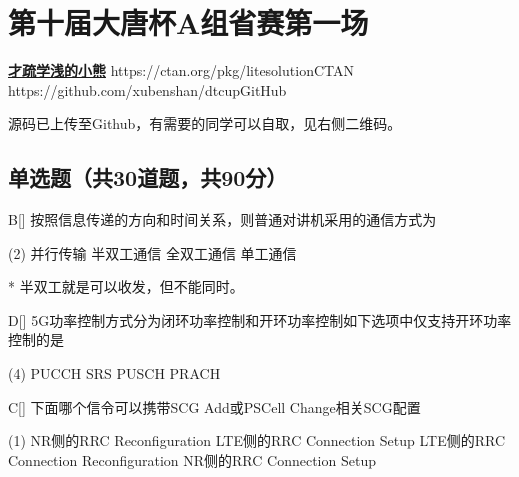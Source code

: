 \chapter{第十届大唐杯A组省赛第一场}
\fancyhead[R]{\color{H6}\kaishu\rightmark\,}

\date{2023年4月08日}{}{\href{https://qm.qq.com/q/UPbGudx8cK}{\textbf{才疏学浅的小熊}}}
{}
{https://ctan.org/pkg/litesolution}{CTAN}
{https://github.com/xubenshan/dtcup}{GitHub}


源码已上传至Github，有需要的同学可以自取，见右侧二维码。

\section{单选题（共30道题，共90分）}



\begin{choice}{B}[]
    按照信息传递的方向和时间关系，则普通对讲机采用的通信方式为
    \begin{tasks}(2)
        \task 并行传输
        \task 半双工通信
        \task 全双工通信
        \task 单工通信
    \end{tasks}
\end{choice}

\begin{solution}*
    半双工就是可以收发，但不能同时。

\end{solution}


\begin{choice}{D}[]
    5G功率控制方式分为闭环功率控制和开环功率控制如下选项中仅支持开环功率控制的是
    \begin{tasks}(4)
        \task PUCCH
        \task SRS
        \task PUSCH
        \task PRACH
    \end{tasks}
\end{choice}



\begin{choice}{C}[]
    下面哪个信令可以携带SCG Add或PSCell Change相关SCG配置
    \begin{tasks}(1)
        \task NR侧的RRC Reconfiguration
        \task LTE侧的RRC Connection Setup
        \task LTE侧的RRC Connection Reconfiguration
        \task NR侧的RRC Connection Setup
    \end{tasks}
\end{choice}


